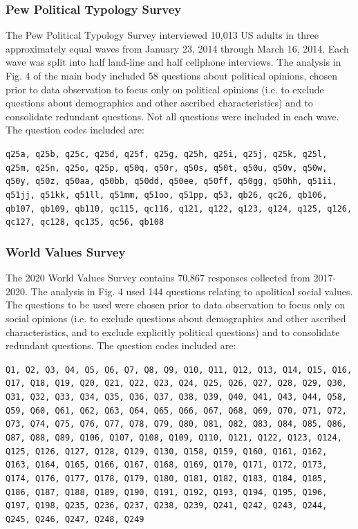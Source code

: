 \documentclass{article}
\begin{document}
\subsubsection{Pew Political Typology Survey}
The Pew Political Typology Survey interviewed 10,013 US adults in three approximately equal waves from January 23, 2014 through March 16, 2014. Each wave was split into half land-line and half cellphone interviews. The analysis in Fig. 4 of the main body included 58 questions about political opinions, chosen prior to data observation to focus only on political opinions (i.e. to exclude questions about demographics and other ascribed characteristics) and to consolidate redundant questions. Not all questions were included in each wave. The question codes included are:

\noindent
\texttt{q25a, q25b, q25c, q25d, q25f, q25g, q25h, q25i, q25j, q25k, q25l, q25m, q25n, q25o, q25p, q50q, q50r, q50s, q50t, q50u, q50v, q50w, q50y, q50z, q50aa, q50bb, q50dd, q50ee, q50ff, q50gg, q50hh, q51ii, q51jj, q51kk, q51ll, q51mm, q51oo, q51pp, q53, qb26, qc26, qb106, qb107, qb109, qb110, qc115, qc116, q121, q122, q123, q124, q125, q126, qc127, qc128, qc135, qc56, qb108}


\subsubsection{World Values Survey}
The 2020 World Values Survey \cite{wvs2020} contains 70,867 responses collected from 2017-2020. The analysis in Fig. 4 used 144 questions relating to apolitical social values. The questions to be used were chosen prior to data observation to focus only on social opinions (i.e. to exclude questions about demographics and other ascribed characteristics, and to exclude explicitly political questions) and to consolidate redundant questions. The question codes included are:

\noindent
\texttt{Q1, Q2, Q3, Q4, Q5, Q6, Q7, Q8, Q9, Q10, Q11, Q12, Q13, Q14, Q15, Q16, Q17, Q18, Q19, Q20, Q21, Q22, Q23, Q24, Q25, Q26, Q27, Q28, Q29, Q30, Q31, Q32, Q33, Q34, Q35, Q36, Q37, Q38, Q39, Q40, Q41, Q43, Q44, Q58, Q59, Q60, Q61, Q62, Q63, Q64, Q65, Q66, Q67, Q68, Q69, Q70, Q71, Q72, Q73, Q74, Q75, Q76, Q77, Q78, Q79, Q80, Q81, Q82, Q83, Q84, Q85, Q86, Q87, Q88, Q89, Q106, Q107, Q108, Q109, Q110, Q121, Q122, Q123, Q124, Q125, Q126, Q127, Q128, Q129, Q130, Q158, Q159, Q160, Q161, Q162, Q163, Q164, Q165, Q166, Q167, Q168, Q169, Q170, Q171, Q172, Q173, Q174, Q176, Q177, Q178, Q179, Q180, Q181, Q182, Q183, Q184, Q185, Q186, Q187, Q188, Q189, Q190, Q191, Q192, Q193, Q194, Q195, Q196, Q197, Q198, Q235, Q236, Q237, Q238, Q239, Q241, Q242, Q243, Q244, Q245, Q246, Q247, Q248, Q249}
\end{document}
